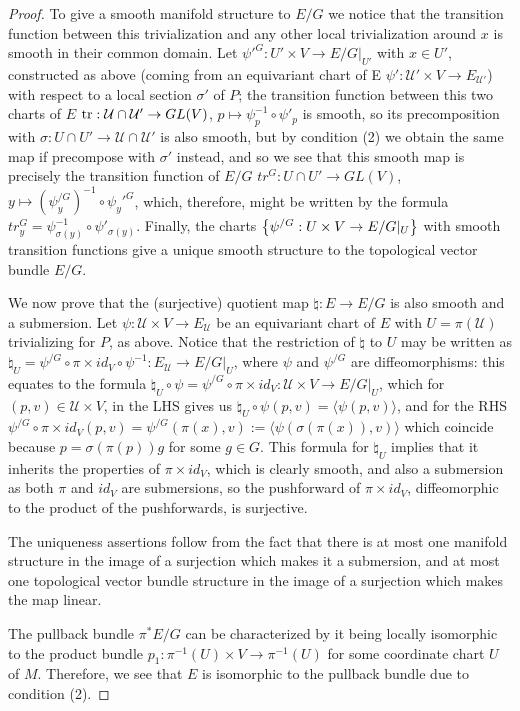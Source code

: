 \begin{proof}
To give a smooth manifold structure to $E/G$ we notice that the transition function between this trivialization and any other local trivialization around $x$ is smooth in their common domain. Let $\psi'^G:U' \times V \to E/G|_{U'}$ with $x \in U'$, constructed as above (coming from an equivariant chart of E $\psi': \mathcal U' \times V \to E_{\mathcal U'}$) with respect to a local section $\sigma'$ of $P$; the transition function between this two charts of $E$ $\operatorname{tr}: \mathcal U \cap \mathcal U' \to GL(V)$, $p \mapsto \psi^{-1}_p \circ \psi'_p$ is smooth, so its precomposition with $\sigma: U \cap U' \to \mathcal U \cap \mathcal U'$ is also smooth, but by condition (2) we obtain the same map if precompose with $\sigma'$ instead, and so we see that this smooth map is precisely the transition function of $E/G$ $tr^{G}: U \cap U' \to GL(V)$, $y \mapsto (\psi_y^{/G})^{-1} \circ \psi_y'^G$, which, therefore, might be written by the formula $tr^G_y = \psi^{-1}_{\sigma(y)} \circ \psi'_{\sigma(y)}$. Finally, the charts $\left\{ \psi^{/G}:U \times V \to E/G|_U \right\}$ with smooth transition functions give a unique smooth structure to the topological vector bundle $E/G$.

We now prove that the (surjective) quotient map $\natural : E \to E/G$ is also smooth and a submersion. Let $\psi: \mathcal U \times V \to E_{\mathcal U}$ be an equivariant chart of $E$ with $U = \pi(\mathcal U)$ trivializing for $P$, as above. Notice that the restriction of $\natural$ to $U$ may be written as $\natural_U = \psi^{/G} \circ \pi \times id_V \circ \psi^{-1}: E_{\mathcal U} \to E/G|_U$, where $\psi$ and $\psi^{/G}$ are diffeomorphisms: this equates to the formula $\natural_U \circ \psi = \psi^{/G} \circ \pi \times id_V: \mathcal U \times V \to E/G|_U$, which for $(p, v) \in \mathcal U \times V$, in the LHS gives us $\natural_U \circ \psi(p, v) = \langle\psi(p, v)\rangle$, and for the RHS $\psi^{/G} \circ \pi \times id_V (p, v) = \psi^{/G}(\pi(x), v) := \langle\psi(\sigma(\pi(x)), v)\rangle$ which coincide because $p = \sigma(\pi(p))g$ for some $g \in G$. This formula for $\natural_U$ implies that it inherits the properties of $\pi \times id_V$, which is clearly smooth, and also a submersion as both $\pi$ and $id_V$ are submersions, so the pushforward of $\pi \times id_V$, diffeomorphic to the product of the pushforwards, is surjective.

The uniqueness assertions follow from the fact that there is at most one manifold structure in the image of a surjection which makes it a submersion, and at most one topological vector bundle structure in the image of a surjection which makes the map linear.

The pullback bundle $\pi^*E/G$ can be characterized by it being locally isomorphic to the product bundle $p_1: \pi^{-1}(U) \times V \to \pi^{-1}(U)$ for some coordinate chart $U$ of $M$. Therefore, we see that $E$ is isomorphic to the pullback bundle due to condition (2).
\end{proof}

